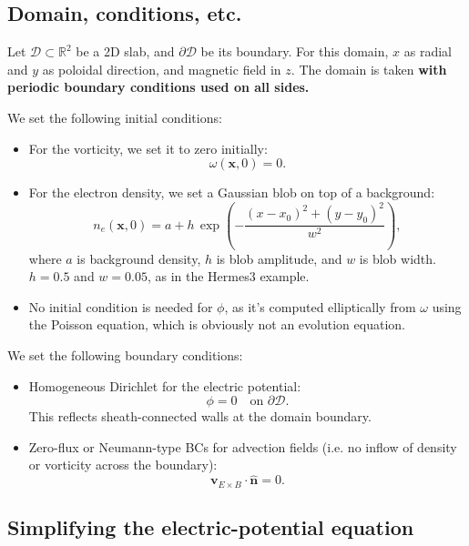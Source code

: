 \documentclass[12pt]{article}
\begin{document}
\subsection{Domain, conditions, etc.}

Let $\mathcal{D} \subset \mathbb{R}^2$ be a 2D slab, and $\partial\mathcal{D}$ be its boundary. For this domain, $x$ as radial and $y$ as poloidal direction, and magnetic field in $z$. The domain is taken \textbf{with periodic boundary conditions used on all sides.}

We set the following initial conditions:
%
\begin{itemize}
    \item For the vorticity, we set it to zero initially:
    \begin{equation}
        \omega(\bm{x}, 0) = 0.
    \end{equation}
    \item For the electron density, we set a Gaussian blob on top of a background:
    \begin{equation}
        n_e(\bm{x}, 0) = a + h \, \exp \left( - \frac{(x - x_0)^2 + (y - y_0)^2}{w^2} \right),
    \end{equation}
    where $a$ is background density, $h$ is blob amplitude, and $w$ is blob width. $h = 0.5$ and $w = 0.05$, as in the Hermes3 example.
    \item No initial condition is needed for $\phi$, as it's computed elliptically from $\omega$ using the Poisson equation, which is obviously not an evolution equation.
\end{itemize}

We set the following boundary conditions:
%
\begin{itemize}
    \item Homogeneous Dirichlet for the electric potential:
    \begin{equation}
        \phi = 0 \quad \text{on } \partial \mathcal{D} .
    \end{equation}
    This reflects sheath-connected walls at the domain boundary.
    \item Zero-flux or Neumann-type BCs for advection fields (i.e. no inflow of density or vorticity across the boundary):
    \begin{equation}
        \bm{v}_{E \times B} \cdot \hat{\bm{n}} = 0.
    \end{equation}
\end{itemize}

\subsection{Simplifying the electric-potential equation}
\end{document}

